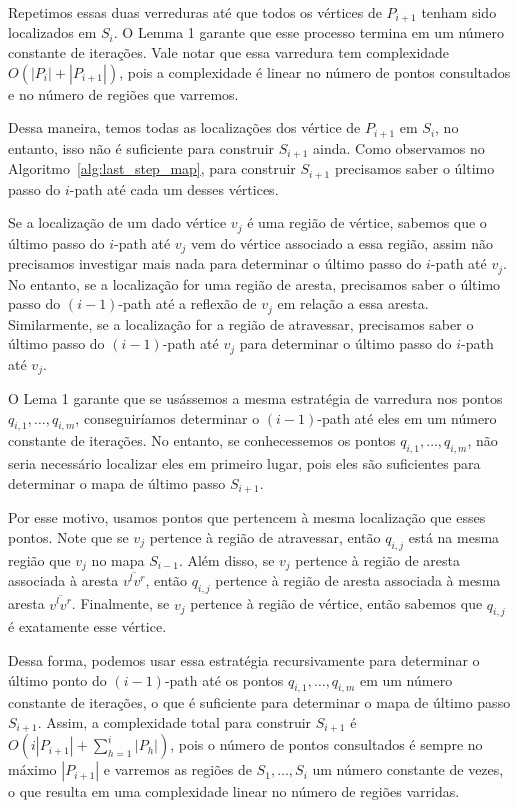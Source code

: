 \documentclass[11pt]{article}
\newcommand{\algref}[1]{\ref{#1}}
\begin{document}
Repetimos essas duas verreduras até que todos os vértices de \(P_{i + 1}\) tenham sido localizados em \(S_i\). O Lemma 1 garante que esse processo termina em um número constante de iterações. Vale notar que essa varredura tem complexidade \(O(|P_i| + |P_{i + 1}|)\), pois a complexidade é linear no número de pontos consultados e no número de regiões que varremos.

Dessa maneira, temos todas as localizações dos vértice de \(P_{i + 1}\) em \(S_i\), no entanto, isso não é suficiente para construir \(S_{i + 1}\) ainda. Como observamos no Algoritmo~\algref{alg:last_step_map}, para construir \(S_{i + 1}\) precisamos saber o último passo do \(i\)-path até cada um desses vértices.

Se a localização de um dado vértice \(v_j\) é uma região de vértice, sabemos que o último passo do \(i\)-path até \(v_j\) vem do vértice associado a essa região, assim não precisamos investigar mais nada para determinar o último passo do \(i\)-path até \(v_j\). No entanto, se a localização for uma região de aresta, precisamos saber o último passo do \((i - 1)\)-path até a reflexão de \(v_j\) em relação a essa aresta. Similarmente, se a localização for a região de atravessar, precisamos saber o último passo do \((i - 1)\)-path até \(v_j\) para determinar o último passo do \(i\)-path até \(v_j\).

O Lema 1 garante que se usássemos a mesma estratégia de varredura nos pontos \(q_{i,1}, \dots, q_{i,m}\), conseguiríamos determinar o \((i - 1)\)-path até eles em um número constante de iterações. No entanto, se conhecessemos os pontos \(q_{i,1}, \dots, q_{i,m}\), não seria necessário localizar eles em primeiro lugar, pois eles são suficientes para determinar o mapa de último passo \(S_{i + 1}\). 

Por esse motivo, usamos pontos que pertencem à mesma localização que esses pontos. Note que se \(v_j\) pertence à região de atravessar, então \(q_{i,j}\) está na mesma região que \(v_j\) no mapa \(S_{i - 1}\). Além disso, se \(v_j\) pertence à região de aresta associada à aresta \(\overline{v^l v^r}\), então \(q_{i,j}\) pertence à região de aresta associada à mesma aresta \(\overline{v^l v^r}\). Finalmente, se \(v_j\) pertence à região de vértice, então sabemos que \(q_{i,j}\) é exatamente esse vértice.

Dessa forma, podemos usar essa estratégia recursivamente para determinar o último ponto do \((i - 1)\)-path até os pontos \(q_{i,1}, \dots, q_{i,m}\) em um número constante de iterações, o que é suficiente para determinar o mapa de último passo \(S_{i + 1}\). Assim, a complexidade total para construir \(S_{i + 1}\) é \(O(i|P_{i + 1}| + \sum_{h=1}^{i} |P_h|)\), pois o número de pontos consultados é sempre no máximo \(|P_{i + 1}|\) e varremos as regiões de \(S_1, \dots, S_i\) um número constante de vezes, o que resulta em uma complexidade linear no número de regiões varridas.
\end{document}

